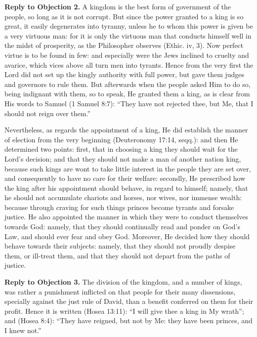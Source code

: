 \textbf{Reply to Objection 2.} A kingdom is the best form of government of the people, so long as it is not corrupt. But since the power granted to a king is so great, it easily degenerates into tyranny, unless he to whom this power is given be a very virtuous man: for it is only the virtuous man that conducts himself well in the midst of prosperity, as the Philosopher observes (Ethic. iv, 3). Now perfect virtue is to be found in few: and especially were the Jews inclined to cruelty and avarice, which vices above all turn men into tyrants. Hence from the very first the Lord did not set up the kingly authority with full power, but gave them judges and governors to rule them. But afterwards when the people asked Him to do so, being indignant with them, so to speak, He granted them a king, as is clear from His words to Samuel (1 Samuel 8:7): ``They have not rejected thee, but Me, that I should not reign over them.''

Nevertheless, as regards the appointment of a king, He did establish the manner of election from the very beginning (Deuteronomy 17:14, seqq.): and then He determined two points: first, that in choosing a king they should wait for the Lord's decision; and that they should not make a man of another nation king, because such kings are wont to take little interest in the people they are set over, and consequently to have no care for their welfare: secondly, He prescribed how the king after his appointment should behave, in regard to himself; namely, that he should not accumulate chariots and horses, nor wives, nor immense wealth: because through craving for such things princes become tyrants and forsake justice. He also appointed the manner in which they were to conduct themselves towards God: namely, that they should continually read and ponder on God's Law, and should ever fear and obey God. Moreover, He decided how they should behave towards their subjects: namely, that they should not proudly despise them, or ill-treat them, and that they should not depart from the paths of justice.

\textbf{Reply to Objection 3.} The division of the kingdom, and a number of kings, was rather a punishment inflicted on that people for their many dissensions, specially against the just rule of David, than a benefit conferred on them for their profit. Hence it is written (Hosea 13:11): ``I will give thee a king in My wrath''; and (Hosea 8:4): ``They have reigned, but not by Me: they have been princes, and I knew not.''

